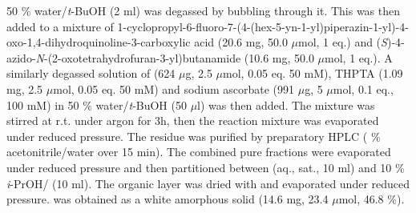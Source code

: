 {{{{{{{{{{{{{50 \% water/\textit{t}-BuOH (2 ml) was degassed by bubbling  through it. This was then added to a mixture of 1-cyclopropyl-6-fluoro-7-(4-(hex-5-yn-1-yl)piperazin-1-yl)-4-oxo-1,4\hyp{}dihydro\-quinoline-3-carboxylic acid  (20.6 mg, 50.0 $\mu$mol, 1 eq.) and (\textit{S})-4-azido-\textit{N}-(2-oxotetrahydrofuran-3-yl)butanamide  (10.6 mg, 50.0 $\mu$mol, 1 eq.).
A similarly degassed solution of  (624 $\mu$g, 2.5 $\mu$mol, 0.05 eq. 50 mM), THPTA (1.09 mg, 2.5 $\mu$mol, 0.05 eq. 50 mM) and sodium ascorbate (991 $\mu$g, 5 $\mu$mol, 0.1 eq., 100 mM) in 50 \% water/\textit{t}-BuOH (50 $\mu$l) was then added. 
The mixture was stirred at r.t. under argon for 3h, then the reaction mixture was evaporated under reduced pressure. The residue was purified by preparatory HPLC ( \% acetonitrile/water over 15 min). 
The combined pure fractions were evaporated under reduced pressure and then partitioned between  (aq., sat., 10 ml) and 10 \% \textit{i}-PrOH/ (10 ml). The organic layer was dried with  and evaporated under reduced pressure.
 was obtained as a white amorphous solid (14.6 mg, 23.4 $\mu$mol, 46.8 \%).
\\[1\baselineskip]
\\[1\baselineskip]
}}}}}}}}}}}}}

